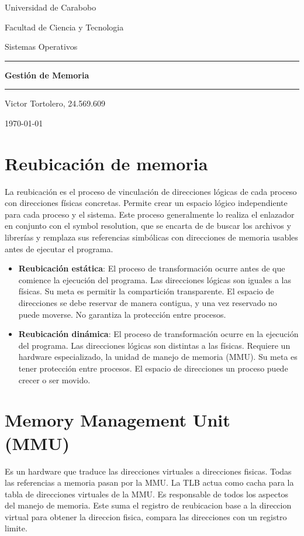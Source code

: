 \documentclass{article}
\begin{document}
\centerline{Universidad de Carabobo}
\centerline{Facultad de Ciencia y Tecnologia}
\centerline{Sistemas Operativos}
\vspace{7cm}
\begin{centering}
	\hrule 	\vspace{0.4cm}
	{ \Huge \bfseries Gestión de Memoria \\[0.4cm] }
	\hrule \vfill
\end{centering}
\vfill
\centerline{Victor Tortolero, 24.569.609}
\centerline{\today}
\newpage


\section*{Reubicación de memoria}
La reubicación es el proceso de vinculación de direcciones lógicas de cada proceso con direcciones físicas concretas.
Permite crear un espacio lógico independiente para cada proceso y el sistema.
Este proceso generalmente lo realiza el enlazador en conjunto con el symbol resolution, que se encarta de de buscar los archivos
y librerías y remplaza sus referencias simbólicas con direcciones de memoria usables antes de ejecutar el programa.

\begin{itemize}
	\item \textbf{Reubicación estática}: El proceso de transformación ocurre antes de que comience la ejecución del programa. Las direcciones lógicas son iguales a las físicas. Su meta
	es permitir la compartición transparente. El espacio de direcciones se debe reservar de manera contigua, y una vez reservado
	no puede moverse. No garantiza la protección entre procesos.
	
	\item \textbf{Reubicación dinámica}: El proceso de transformación ocurre en la ejecución del programa. Las direcciones lógicas son distintas a las físicas. Requiere un hardware especializado, la unidad de manejo de memoria (MMU). Su meta es tener protección entre procesos. El espacio de direcciones un proceso puede crecer o ser movido.
\end{itemize}

\section*{Memory Management Unit (MMU)}
Es un hardware que traduce las direcciones virtuales a direcciones fisicas. Todas las referencias a memoria pasan por la MMU. La TLB
actua como cacha para la tabla de direcciones virtuales de la MMU.
Es responsable de todos los aspectos del manejo de memoria.
Este suma el registro de reubicacion base a la direccion virtual para obtener la direccion fisica, compara las direcciones con un registro limite.
\end{document}
